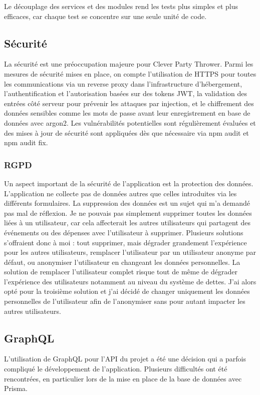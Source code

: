 Le découplage des services et des modules rend les tests plus simples et plus efficaces, car chaque test se concentre sur une seule unité de code.

\subsection{Sécurité}\label{subsec:securite}
La sécurité est une préoccupation majeure pour Clever Party Thrower.
Parmi les mesures de sécurité mises en place, on compte l'utilisation de HTTPS pour toutes les communications via un reverse proxy dans l'infrastructure d'hébergement,
l'authentification et l'autorisation basées sur des tokens JWT, la validation des entrées côté serveur pour prévenir les attaques par injection,
et le chiffrement des données sensibles comme les mots de passe avant leur enregistrement en base de données avec argon2.
Les vulnérabilités potentielles sont régulièrement évaluées et des mises à jour de sécurité sont appliquées dès que nécessaire via npm audit et npm audit fix.

\subsubsection{RGPD}
Un aspect important de la sécurité de l'application est la protection des données.
L'application ne collecte pas de données autres que celles introduites via les différents formulaires.
La suppression des données est un sujet qui m'a demandé pas mal de réflexion.
Je ne pouvais pas simplement supprimer toutes les données liées à un utilisateur, car cela affecterait les autres utilisateurs qui partagent des événements ou des dépenses avec l'utilisateur à supprimer.
Plusieurs solutions s'offraient donc à moi : tout supprimer, mais dégrader grandement l'expérience pour les autres utilisateurs, remplacer l'utilisateur par un utilisateur anonyme par défaut, ou anonymiser l'utilisateur en changeant les données personnelles.
La solution de remplacer l'utilisateur complet risque tout de même de dégrader l'expérience des utilisateurs notamment au niveau du système de dettes.
J'ai alors opté pour la troisième solution et j'ai décidé de changer uniquement les données personnelles de l'utilisateur afin de l'anonymiser sans pour autant impacter les autres utilisateurs.

\subsection{GraphQL}\label{subsec:graphql}
L'utilisation de GraphQL pour l'API du projet a été une décision qui a parfois compliqué le développement de l'application.
Plusieurs difficultés ont été rencontrées, en particulier lors de la mise en place de la base de données avec Prisma.\\


